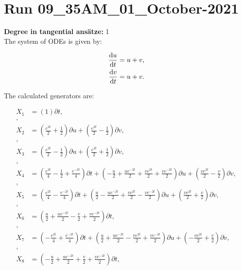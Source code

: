 \section*{Run 09\_35AM\_01\_October-2021}
\textbf{Degree in tangential ansätze:}	1\\
The system of ODEs is given by:

\begin{align*}
\dv{u}{t}&=u + v,\\
\dv{v}{t}&=u + v.\\
\end{align*}

\noindent The calculated generators are:

\begin{align*}
X_{1}&=\left( 1 \right)\partial t,\\
,\\
X_{2}&=\left( \frac{e^{2 t}}{2} + \frac{1}{2} \right)\partial u+\left( \frac{e^{2 t}}{2} - \frac{1}{2} \right)\partial v,\\
,\\
X_{3}&=\left( \frac{e^{2 t}}{2} - \frac{1}{2} \right)\partial u+\left( \frac{e^{2 t}}{2} + \frac{1}{2} \right)\partial v,\\
,\\
X_{4}&=\left( \frac{e^{2 t}}{4} - \frac{1}{2} + \frac{e^{- 2 t}}{4} \right)\partial t+\left( - \frac{u}{2} + \frac{u e^{- 2 t}}{2} + \frac{v e^{2 t}}{2} + \frac{v e^{- 2 t}}{2} \right)\partial u+\left( \frac{v e^{2 t}}{2} - \frac{v}{2} \right)\partial v,\\
,\\
X_{5}&=\left( \frac{e^{2 t}}{4} - \frac{e^{- 2 t}}{4} \right)\partial t+\left( \frac{u}{2} - \frac{u e^{- 2 t}}{2} + \frac{v e^{2 t}}{2} - \frac{v e^{- 2 t}}{2} \right)\partial u+\left( \frac{v e^{2 t}}{2} + \frac{v}{2} \right)\partial v,\\
,\\
X_{6}&=\left( \frac{u}{2} + \frac{u e^{- 2 t}}{2} - \frac{v}{2} + \frac{v e^{- 2 t}}{2} \right)\partial t,\\
,\\
X_{7}&=\left( - \frac{e^{2 t}}{4} + \frac{e^{- 2 t}}{4} \right)\partial t+\left( \frac{u}{2} + \frac{u e^{- 2 t}}{2} - \frac{v e^{2 t}}{2} + \frac{v e^{- 2 t}}{2} \right)\partial u+\left( - \frac{v e^{2 t}}{2} + \frac{v}{2} \right)\partial v,\\
,\\
X_{8}&=\left( - \frac{u}{2} + \frac{u e^{- 2 t}}{2} + \frac{v}{2} + \frac{v e^{- 2 t}}{2} \right)\partial t,\\

\end{align*}

